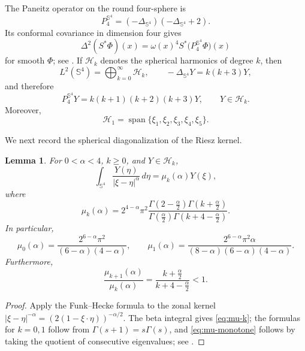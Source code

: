 \documentclass[11pt]{article}
\newtheorem{lemma}[theorem]{Lemma}
\numberwithin{equation}{section}
\begin{document}
The Paneitz operator on the round four-sphere is
\begin{equation*}
P_{4}^{\mathbb S^{4}}
=(-\Delta_{\mathbb S^{4}})(-\Delta_{\mathbb S^{4}}+2).
\end{equation*}
Its conformal covariance in dimension four gives
\begin{equation}\label{eq:Paneitz-covariance}
\Delta^{2}(S^{*}\Phi)(x)
=\omega(x)^{4}
S^{*}\bigl(P_{4}^{\mathbb S^{4}}\Phi\bigr)(x)
\end{equation}
for smooth \(\Phi\); see \cite{Paneitz,Beckner}. If \(\mathcal H_{k}\) denotes the spherical harmonics of degree \(k\), then
\[
L^{2}(\mathbb S^{4})=\bigoplus_{k=0}^{\infty}\mathcal H_{k},
\qquad
-\Delta_{\mathbb S^{4}}Y=k(k+3)Y,
\]
and therefore
\begin{equation}\label{eq:Paneitz-eigen}
P_{4}^{\mathbb S^{4}}Y
=k(k+1)(k+2)(k+3)Y,
\qquad Y\in\mathcal H_{k}.
\end{equation}
Moreover,
\[
\mathcal H_{1}=\operatorname{span}\{\xi_{1},\xi_{2},\xi_{3},\xi_{4},\xi_{5}\}.
\]

We next record the spherical diagonalization of the Riesz kernel.

\begin{lemma}\label{lem:Funk-Hecke}
For \(0<\alpha<4\), \(k\geq0\), and \(Y\in\mathcal H_{k}\),
\begin{equation*}
\int_{\mathbb S^{4}}\frac{Y(\eta)}{|\xi-\eta|^{\alpha}}\,d\eta
=\mu_{k}(\alpha)Y(\xi),
\end{equation*}
where
\begin{equation}\label{eq:mu-k}
\mu_{k}(\alpha)=
2^{4-\alpha}\pi^{2}
\frac{
\Gamma\left(2-\frac{\alpha}{2}\right)
\Gamma\left(k+\frac{\alpha}{2}\right)
}{
\Gamma\left(\frac{\alpha}{2}\right)
\Gamma\left(k+4-\frac{\alpha}{2}\right)
}.
\end{equation}
In particular,
\begin{equation}\label{eq:mu0-mu1}
\mu_{0}(\alpha)=
\frac{2^{6-\alpha}\pi^{2}}{(6-\alpha)(4-\alpha)},
\qquad
\mu_{1}(\alpha)=
\frac{2^{6-\alpha}\pi^{2}\alpha}
{(8-\alpha)(6-\alpha)(4-\alpha)}.
\end{equation}
Furthermore,
\begin{equation}\label{eq:mu-monotone}
\frac{\mu_{k+1}(\alpha)}{\mu_{k}(\alpha)}
=\frac{k+\frac{\alpha}{2}}{k+4-\frac{\alpha}{2}}<1.
\end{equation}
\end{lemma}

\begin{proof}
Apply the Funk--Hecke formula to the zonal kernel \(|\xi-\eta|^{-\alpha}=(2(1-\xi\cdot\eta))^{-\alpha/2}\). The beta integral gives \eqref{eq:mu-k}; the formulas for \(k=0,1\) follow from \(\Gamma(s+1)=s\Gamma(s)\), and \eqref{eq:mu-monotone} follows by taking the quotient of consecutive eigenvalues; see \cite{AtkinsonHan,DaiXu}.
\end{proof}
\end{document}
